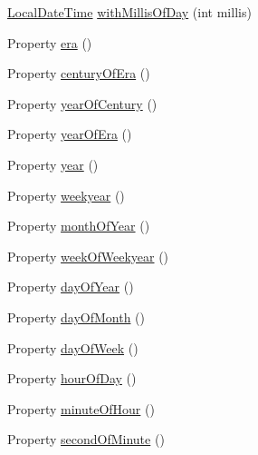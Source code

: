 \begin{DoxyCompactItemize}
\item 
\hyperlink{classorg_1_1joda_1_1time_1_1_local_date_time}{Local\-Date\-Time} \hyperlink{classorg_1_1joda_1_1time_1_1_local_date_time_a6c594cceaa1be6ae455cda2e507cd43c}{with\-Millis\-Of\-Day} (int millis)
\item 
Property \hyperlink{classorg_1_1joda_1_1time_1_1_local_date_time_a9632429cd57aaa66271f6bc725d25ecb}{era} ()
\item 
Property \hyperlink{classorg_1_1joda_1_1time_1_1_local_date_time_a0aa9e9a778040190819814d41b67e833}{century\-Of\-Era} ()
\item 
Property \hyperlink{classorg_1_1joda_1_1time_1_1_local_date_time_a54713b854ae34cda54e03905460a70ae}{year\-Of\-Century} ()
\item 
Property \hyperlink{classorg_1_1joda_1_1time_1_1_local_date_time_a06bc0d56cf2c7cc4f04d72b6dbd4af69}{year\-Of\-Era} ()
\item 
Property \hyperlink{classorg_1_1joda_1_1time_1_1_local_date_time_a204e5baf4064e68f6643ddc2e5bb5218}{year} ()
\item 
Property \hyperlink{classorg_1_1joda_1_1time_1_1_local_date_time_a34521023516fbd3b11f36dba5a512850}{weekyear} ()
\item 
Property \hyperlink{classorg_1_1joda_1_1time_1_1_local_date_time_aa150366f50fde648fce8197873491938}{month\-Of\-Year} ()
\item 
Property \hyperlink{classorg_1_1joda_1_1time_1_1_local_date_time_ae21b6d2d908ee5f1c8b2ab49df3279a9}{week\-Of\-Weekyear} ()
\item 
Property \hyperlink{classorg_1_1joda_1_1time_1_1_local_date_time_aa35ba27409b6a174d9b18a54ec601a40}{day\-Of\-Year} ()
\item 
Property \hyperlink{classorg_1_1joda_1_1time_1_1_local_date_time_abcc5d49a5abca169b71d2a61697ffa47}{day\-Of\-Month} ()
\item 
Property \hyperlink{classorg_1_1joda_1_1time_1_1_local_date_time_a9563e0454d08813446b1ac4cf91e8dbe}{day\-Of\-Week} ()
\item 
Property \hyperlink{classorg_1_1joda_1_1time_1_1_local_date_time_a0cef0e3789bc2a1b01172b7247687127}{hour\-Of\-Day} ()
\item 
Property \hyperlink{classorg_1_1joda_1_1time_1_1_local_date_time_a6c4f0b7bf43fcef44770d5fe74a7a2eb}{minute\-Of\-Hour} ()
\item 
Property \hyperlink{classorg_1_1joda_1_1time_1_1_local_date_time_a2fb8c6e0a7bbd751278fa1eb66211ff7}{second\-Of\-Minute} ()
\item 

\end{DoxyCompactItemize}
